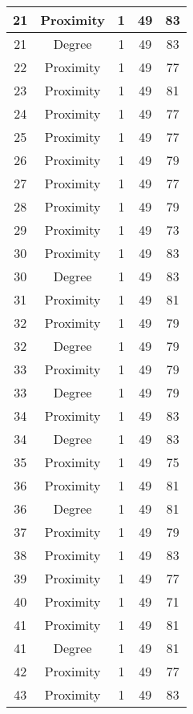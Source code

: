\documentclass[results.tex]{subfiles}
\begin{document}
\begin{center}
\begin{tabular}{| c || c | c | c | c |}
    \hline
    21 & Proximity & 1 & 49 & 83 \\ 
    \hline
    21 & Degree & 1 & 49 & 83 \\ 
    \hline
    22 & Proximity & 1 & 49 & 77 \\ 
    \hline
    23 & Proximity & 1 & 49 & 81 \\ 
    \hline
    24 & Proximity & 1 & 49 & 77 \\ 
    \hline
    25 & Proximity & 1 & 49 & 77 \\ 
    \hline
    26 & Proximity & 1 & 49 & 79 \\ 
    \hline
    27 & Proximity & 1 & 49 & 77 \\ 
    \hline
    28 & Proximity & 1 & 49 & 79 \\ 
    \hline
    29 & Proximity & 1 & 49 & 73 \\ 
    \hline
    30 & Proximity & 1 & 49 & 83 \\ 
    \hline
    30 & Degree & 1 & 49 & 83 \\ 
    \hline
    31 & Proximity & 1 & 49 & 81 \\ 
    \hline
    32 & Proximity & 1 & 49 & 79 \\ 
    \hline
    32 & Degree & 1 & 49 & 79 \\ 
    \hline
    33 & Proximity & 1 & 49 & 79 \\ 
    \hline
    33 & Degree & 1 & 49 & 79 \\ 
    \hline
    34 & Proximity & 1 & 49 & 83 \\ 
    \hline
    34 & Degree & 1 & 49 & 83 \\ 
    \hline
    35 & Proximity & 1 & 49 & 75 \\ 
    \hline
    36 & Proximity & 1 & 49 & 81 \\ 
    \hline
    36 & Degree & 1 & 49 & 81 \\ 
    \hline
    37 & Proximity & 1 & 49 & 79 \\ 
    \hline
    38 & Proximity & 1 & 49 & 83 \\ 
    \hline
    39 & Proximity & 1 & 49 & 77 \\ 
    \hline
    40 & Proximity & 1 & 49 & 71 \\ 
    \hline
    41 & Proximity & 1 & 49 & 81 \\ 
    \hline
    41 & Degree & 1 & 49 & 81 \\ 
    \hline
    42 & Proximity & 1 & 49 & 77 \\ 
    \hline
    43 & Proximity & 1 & 49 & 83 \\ 

\end{tabular}
\end{center}
\end{document}
